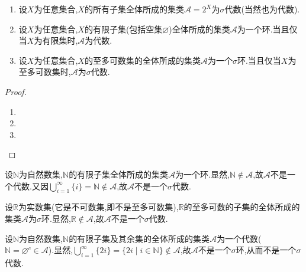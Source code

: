 \documentclass[../../main.tex]{subfiles}%
\begin{document}
\begin{proposition}\label{proposition:集合论----环和代数的例子}
\begin{enumerate}[(1)]
\item\label{proposition:集合论----环和代数的例子-1} 设$X$为任意集合,$X$的所有子集全体所成的集类$\mathscr{A}=2^X$为$\sigma$代数(当然也为代数).

\item\label{proposition:集合论----环和代数的例子-2} 设$X$为任意集合,$X$的有限子集(包括空集$\varnothing$)全体所成的集类$\mathscr{A}$为一个环.当且仅当$X$为有限集时,$\mathscr{A}$为代数.

\item\label{proposition:集合论----环和代数的例子-3} 设$X$为任意集合,$X$的至多可数集的全体所成的集类$\mathscr{A}$为一个$\sigma$环.当且仅当$X$为至多可数集时,$\mathscr{A}$为$\sigma$代数.
\end{enumerate}
\end{proposition}
\begin{proof}
\begin{enumerate}[(1)]
\item 

\item 

\item 
\end{enumerate}
\end{proof}

\begin{example}\label{example:12213反例1}
设$\mathbb{N}$为自然数集,$\mathbb{N}$的有限子集全体所成的集类$\mathscr{A}$为一个环.显然,$\mathbb{N} \notin \mathscr{A}$,故$\mathscr{A}$不是一个代数.又因$\bigcup_{i=1}^{\infty} \{i\} = \mathbb{N} \notin \mathscr{A}$,故$\mathscr{A}$不是一个$\sigma$代数.
\end{example}

\begin{example}\label{example:12213反例2}
设$\mathbb{R}$为实数集(它是不可数集,即不是至多可数集),$\mathbb{R}$的至多可数的子集的全体所成的集类$\mathscr{A}$为$\sigma$环.显然,$\mathbb{R} \notin \mathscr{A}$,故$\mathscr{A}$不是一个$\sigma$代数.
\end{example}

\begin{example}\label{example:12213反例3}
设$\mathbb{N}$为自然数集,$\mathbb{N}$的有限子集及其余集的全体所成的集类$\mathscr{A}$为一个代数($\mathbb{N} = \varnothing^c \in \mathscr{A}$).显然,$\bigcup_{i=1}^{\infty} \{2i\} = \{2i \mid i \in \mathbb{N}\} \notin \mathscr{A}$,故$\mathscr{A}$不是一个$\sigma$环,从而不是一个$\sigma$代数.
\end{example}
\end{document}
